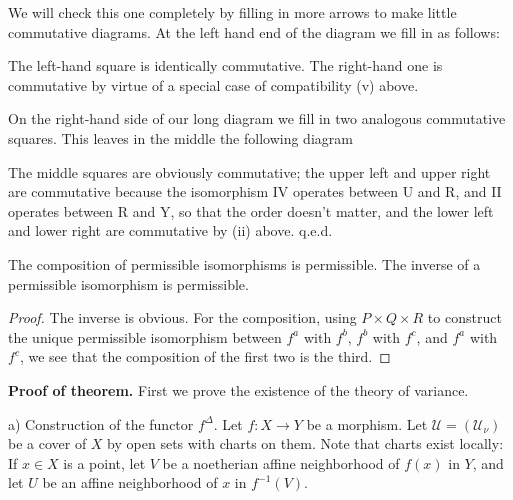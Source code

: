 \documentclass[12pt]{book}
\begin{document}
We will check this one completely by filling in more arrows to make little commutative diagrams. At the left hand end of the diagram we fill in as follows:

The left-hand square is identically commutative. The right-hand one is commutative by virtue of a special case of compatibility (v) above.

\setcounter{page}{325}
On the right-hand side of our long diagram we fill in two analogous commutative squares. This leaves in the middle the following diagram

The middle squares are obviously commutative; the upper left and upper right are commutative because the isomorphism IV operates between U and R, and II operates between R and Y, so that the order doesn't matter, and the lower left and lower right are commutative by (ii) above. q.e.d.

\begin{lemma}
The composition of permissible isomorphisms is permissible. The inverse of a permissible isomorphism is permissible.
\end{lemma}

\begin{proof}
The inverse is obvious. For the composition, using \(P \times Q \times R\) to construct the unique permissible isomorphism between \(f^{a}\) with \(f^{b}\), \(f^{b}\) with \(f^{c}\), and \(f^{a}\) with \(f^{c}\), we see that the composition of the first two is the third.
\end{proof}

\textbf{Proof of theorem.} First we prove the existence of the theory of variance.

a) Construction of the functor \(f^{\Delta}\). Let \(f: X \to Y\) be a morphism. Let \(\mathcal{U}=(\mathcal{U}_{\nu})\) be a cover of \(X\) by open sets with charts on them. Note that charts exist locally: If \(x \in X\) is a point, let \(V\) be a noetherian affine neighborhood of \(f(x)\) in \(Y\), and let \(U\) be an affine neighborhood of \(x\) in \(f^{-1}(V)\).
\end{document}
